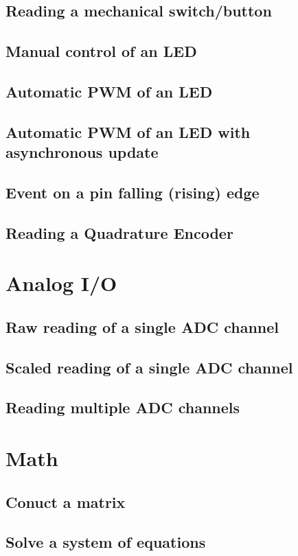 \documentclass[10pt,letterpaper]{memoir} %
\begin{document}
\section{Reading a mechanical switch/button}
\section{Manual control of an LED}
\section{Automatic PWM of an LED}
\section{Automatic PWM of an LED with asynchronous update}
\section{Event on a pin falling (rising) edge}
\section{Reading a Quadrature Encoder}

\chapter{Analog I/O}
\section{Raw reading of a single ADC channel}
\section{Scaled reading of a single ADC channel}
\section{Reading multiple ADC channels}

\chapter{Math}
\section{Conuct a matrix}
\section{Solve a system of equations}
\end{document}
